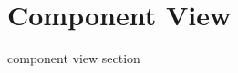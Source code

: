 \documentclass[../../../../dd.tex]{subfiles}
\begin{document}
	\section{Component View}

	component view section
	
\end{document}
